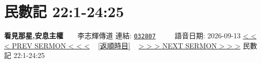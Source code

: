 \documentclass{book}
\begin{document}
\section{民數記 22:1-24:25}
\label{sec:032807}
\textbf{看見那星,安息主權}~~~~李志輝傳道
\newline
\newline
連結: \href{http://www.church.com.hk/acms/content.asp?site=cdc\&op=show\&type=product\&code=032807\&layout=sermon}{\texttt{032807}} ~~~~ 語音日期: 2026-09-13
\newline
\newline
\hyperref[sec:032806]{\small{< < < PREV SERMON < < <}}
~
\hyperref[sec:index_chronic]{\small{[返順時目]}}
~
\hyperref[sec:032808]{\small{> > > NEXT SERMON > > >}}
\newline
\newline
民數記 22:1-24:25
\newline
\end{document}
